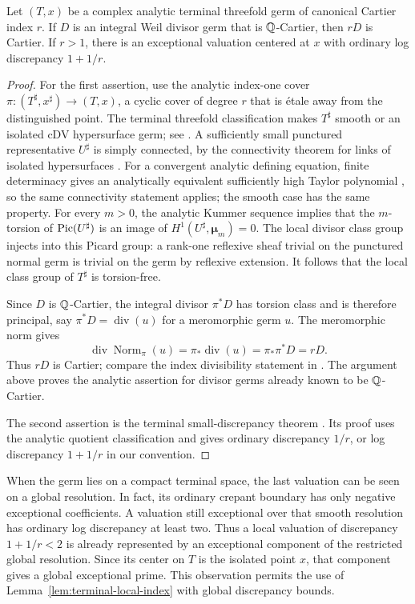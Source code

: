 \begin{lemma}\label{lem:terminal-local-index}
Let $(T,x)$ be a complex analytic terminal threefold germ of canonical
Cartier index $r$.  If $D$ is an integral Weil divisor germ that is
$\mathbb Q$-Cartier, then $rD$ is Cartier.  If $r>1$, there is an exceptional
valuation centered at $x$ with ordinary log discrepancy $1+1/r$.
\end{lemma}

\begin{proof}
For the first assertion, use the analytic index-one cover
$\pi:(T^\sharp,x^\sharp)\to(T,x)$, a cyclic cover of degree $r$ that is
\'etale away from the distinguished point.  The terminal threefold
classification makes $T^\sharp$ smooth or an isolated cDV hypersurface
germ; see \cite{Mori1985}.  A sufficiently small punctured representative
$U^\sharp$ is simply connected, by the connectivity theorem for links of
isolated hypersurfaces \cite[Theorems~2.10 and~5.2]{Milnor1968}.  For a convergent
analytic defining equation, finite determinacy gives an analytically
equivalent sufficiently high Taylor polynomial
\cite[Theorem~6.2, p.~24]{DeJongEtAl1998}, so the same connectivity
statement applies; the smooth case has the same property.  For every
$m>0$, the analytic Kummer sequence implies
that the $m$-torsion of $\operatorname{Pic}(U^\sharp)$ is an image of
$H^1(U^\sharp,\boldsymbol\mu_m)=0$.  The local divisor class group
injects into this Picard group: a rank-one reflexive sheaf trivial on the
punctured normal germ is trivial on the germ by reflexive extension.
It follows that the local class group of $T^\sharp$ is torsion-free.

Since $D$ is $\mathbb Q$-Cartier, the integral divisor $\pi^*D$ has torsion class
and is therefore principal, say $\pi^*D=\operatorname{div}(u)$ for a
meromorphic germ $u$.  The meromorphic norm gives
\[
 \operatorname{div}\operatorname{Norm}_{\pi}(u)
   =\pi_*\operatorname{div}(u)
   =\pi_*\pi^*D=rD.
\]
Thus $rD$ is Cartier; compare the index divisibility statement in
\cite[Lemma~5.1]{Kawamata1988}.  The argument above proves the analytic
assertion for divisor germs already known to be $\mathbb Q$-Cartier.

The second assertion is the terminal small-discrepancy theorem
\cite[Appendix, pp.~193--195]{KawamataAppendix1992}.  Its proof uses the
analytic quotient classification and gives ordinary discrepancy $1/r$, or
log discrepancy $1+1/r$ in our convention.
\end{proof}

When the germ lies on a compact terminal space, the last valuation can be
seen on a global resolution.  In fact, its ordinary crepant boundary has
only negative exceptional coefficients.  A valuation still exceptional
over that smooth resolution has ordinary log discrepancy at least two.
Thus a local valuation of discrepancy $1+1/r<2$ is already represented by
an exceptional component of the restricted global resolution.  Since its
center on $T$ is the isolated point $x$, that component gives a global
exceptional prime.  This observation permits the use of
Lemma~\ref{lem:terminal-local-index} with global discrepancy bounds.

